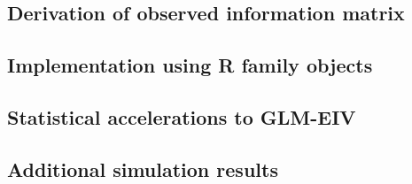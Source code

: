 \documentclass[12pt]{article}
\begin{document}
\subsection{Derivation of observed information matrix}

\subsection{Implementation using R family objects}

\subsection{Statistical accelerations to GLM-EIV}

\subsection{Additional simulation results}



\end{document}
